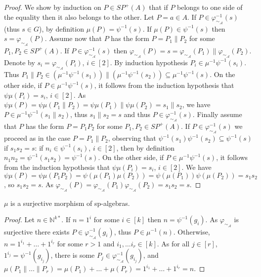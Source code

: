 \documentclass{CSML}
\begin{document}
\begin{proof}
  We show by induction on $P\in SP^+(A)$ that if $P$ belongs to one side of the equality then it also belongs to the other.
Let $P=a\in A$. If $P\in\varphi^{-1}_{\sim_\mathcal{A}}(s)$ (thus $s\in G$), by definition $\mu(P)=\psi^{-1}(s)$. If $\mu(P)\in\psi^{-1}(s)$ then $s=\varphi_{\sim_\mathcal{A}}(P)$.
Assume now that $P$ has the form $P=P_1\parallel P_2$ for some $P_1,P_2\in SP^+(A)$. If $P\in\varphi^{-1}_{\sim_\mathcal{A}}(s)$ then $\varphi_{\sim_\mathcal{A}}(P)=s=\varphi_{\sim_\mathcal{A}}(P_1)\parallel\varphi_{\sim_\mathcal{A}}(P_2)$. Denote by $s_i=\varphi_{\sim_\mathcal{A}}(P_i)$, $i\in[2]$. By induction hypothesis $P_i\in\mu^{-1}\psi^{-1}(s_i)$. Thus $P_1\parallel P_2\in(\mu^{-1}\psi^{-1}(s_1))\parallel(\mu^{-1}\psi^{-1}(s_2))\subseteq \mu^{-1}\psi^{-1}(s)$. On the other side, if $P\in \mu^{-1}\psi^{-1}(s)$, it follows from the induction hypothesis that $\psi\mu(P_i)=s_i$, $i\in[2]$. As $\psi\mu(P)=\psi\mu(P_1\parallel P_2)=\psi\mu(P_1)\parallel\psi\mu(P_2)=s_1\parallel s_2$, we have $P\in\mu^{-1}\psi^{-1}(s_1\parallel s_2)$, thus $s_1\parallel s_2=s$ and thus $P\in\varphi^{-1}_{\sim_\mathcal{A}}(s)$.
Finally assume that $P$ has the form $P=P_1P_2$ for some $P_1,P_2\in SP^+(A)$. If $P\in\varphi^{-1}_{\sim_\mathcal{A}}(s)$ we proceed as in the case $P=P_1\parallel P_2$, observing that $\psi^{-1}(s_1)\psi^{-1}(s_2)\subseteq\psi^{-1}(s)$ if $s_1s_2=s$: if $n_i\in\psi^{-1}(s_i)$, $i\in[2]$, then by definition $n_1n_2=\psi^{-1}(s_1s_2)=\psi^{-1}(s)$. On the other side, if $P\in \mu^{-1}\psi^{-1}(s)$, it follows from the induction hypothesis that $\psi\mu(P_i)=s_i$, $i\in[2]$. We have $\psi\mu(P)=\psi\mu(P_1P_2)=\psi(\mu(P_1)\mu(P_2))=\psi(\mu(P_1))\psi(\mu(P_2))=s_1s_2$,
so $s_1s_2=s$. As $\varphi_{\sim_\mathcal{A}}(P)=\varphi_{\sim_\mathcal{A}}(P_1)\varphi_{\sim_\mathcal{A}}(P_2)=s_1s_2=s$. 
\end{proof}

\begin{lem}
  \label{lem:muSurj}
   $\mu$ is a surjective morphism of sp-algebras.
\end{lem}

\begin{proof}
  Let $n\in\mathbb{N}^{k*}$. If $n=1^i$ for some $i\in[k]$ then $n=\psi^{-1}(g_i)$. As $\varphi_{\sim_\mathcal{A}}$ is surjective there exists $P\in\varphi^{-1}_{\sim_\mathcal{A}}(g_i)$, thus $P\in\mu^{-1}(n)$. Otherwise, $n=1^{i_1}+\dots+1^{i_r}$ for some $r>1$ and $i_1,\dots i_r\in[k]$. As for all $j\in[r]$, $1^{i_j}=\psi^{-1}(g_{i_j})$, there is some $P_j\in\varphi^{-1}_{\sim_\mathcal{A}}(g_{i_j})$, and $\mu(P_1\parallel\dots\parallel P_r)=\mu(P_1)+\dots+\mu(P_r)=1^{i_1}+\dots+1^{i_r}=n$. 
\end{proof}
\end{document}
